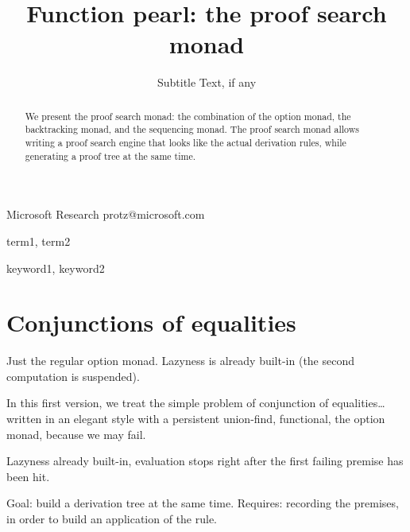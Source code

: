 \documentclass{sigplanconf}
\begin{document}
\setlength{\pdfpageheight}{\paperheight}
\setlength{\pdfpagewidth}{\paperwidth}






\title{Function pearl: the proof search monad}
\subtitle{Subtitle Text, if any}

           {Microsoft Research}
           {protz@microsoft.com}

\maketitle

\begin{abstract}
  We present the proof search monad: the combination of the option monad, the
  backtracking monad, and the sequencing monad. The proof search monad allows
  writing a proof search engine that looks like the actual derivation rules,
  while generating a proof tree at the same time.
\end{abstract}


\terms
term1, term2

\keywords
keyword1, keyword2

\section{Conjunctions of equalities}

Just the regular option monad. Lazyness is already built-in (the second
computation is suspended).

In this first version, we treat the simple problem of conjunction of
equalities\dots written in an elegant style with a persistent union-find,
functional, the option monad, because we may fail.

Lazyness already built-in, evaluation stops right after the first failing
premise has been hit.

Goal: build a derivation tree at the same time. Requires: recording the
premises, in order to build an application of the rule.



\end{document}
